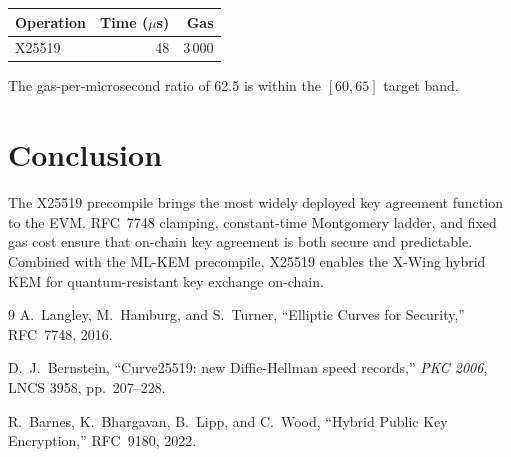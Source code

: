 \documentclass[11pt,a4paper]{article}
\begin{document}
\begin{table}[H]
\centering
\begin{tabular}{lrr}
\toprule
\textbf{Operation} & \textbf{Time ($\mu$s)} & \textbf{Gas} \\
\midrule
X25519 & 48 & 3\,000 \\
\bottomrule
\end{tabular}
\end{table}

The gas-per-microsecond ratio of 62.5 is within the $[60, 65]$ target band.

\section{Conclusion}

The X25519 precompile brings the most widely deployed key agreement function
to the EVM. RFC~7748 clamping, constant-time Montgomery ladder, and fixed gas
cost ensure that on-chain key agreement is both secure and predictable. Combined
with the ML-KEM precompile, X25519 enables the X-Wing hybrid KEM for
quantum-resistant key exchange on-chain.

\begin{thebibliography}{9}
  A.~Langley, M.~Hamburg, and S.~Turner, ``Elliptic Curves for Security,''
  RFC~7748, 2016.

  D.~J.~Bernstein, ``Curve25519: new Diffie-Hellman speed records,''
  \textit{PKC 2006}, LNCS 3958, pp.~207--228.

  R.~Barnes, K.~Bhargavan, B.~Lipp, and C.~Wood,
  ``Hybrid Public Key Encryption,'' RFC~9180, 2022.
\end{thebibliography}
\end{document}
